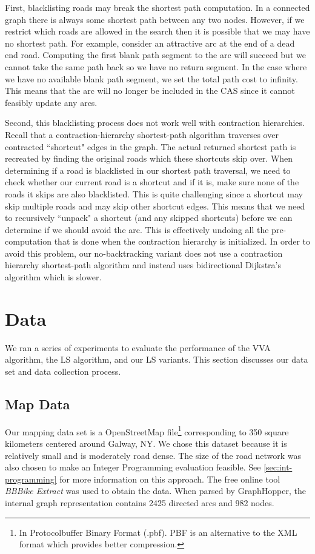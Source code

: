 \documentclass[honors]{union-cs-thesis}
\begin{document}
First, blacklisting roads may break the shortest path computation. In a connected graph there is always some shortest path between any two nodes. However, if we restrict which roads are allowed in the search then it is possible that we may have no shortest path. For example, consider an attractive arc at the end of a dead end road. Computing the first blank path segment to the arc will succeed but we cannot take the same path back so we have no return segment. In the case where we have no available blank path segment, we set the total path cost to infinity. This means that the arc will no longer be included in the CAS since it cannot feasibly update any arcs. 

Second, this blacklisting process does not work well with contraction hierarchies. Recall that a contraction-hierarchy shortest-path algorithm traverses over contracted ``shortcut" edges in the graph. The actual returned shortest path is recreated by finding the original roads which these shortcuts skip over. When determining if a road is blacklisted in our shortest path traversal, we need to check whether our current road is a shortcut and if it is, make sure none of the roads it skips are also blacklisted. This is quite challenging since a shortcut may skip multiple roads and may skip other shortcut edges. This means that we need to recursively ``unpack" a shortcut (and any skipped shortcuts)  before we can determine if we should avoid the arc. This is effectively undoing all the pre-computation that is done when the contraction hierarchy is initialized. In order to avoid this problem, our no-backtracking variant does not use a contraction hierarchy shortest-path algorithm and instead uses bidirectional Dijkstra's algorithm which is slower.


\section{Data}
\label{sec:data}
We ran a series of experiments to evaluate the performance of the VVA algorithm, the LS algorithm, and our LS variants. This section discusses our data set and data collection process.

\subsection{Map Data}
Our mapping data set is a OpenStreetMap file\footnote{In Protocolbuffer Binary Format (.pbf). PBF is an alternative to the XML format which provides better compression.} corresponding to 350 square kilometers centered around Galway, NY. We chose this dataset because it is relatively small and is moderately road dense. The size of the road network was also chosen to make an Integer Programming evaluation feasible. See \cref{sec:int-programming} for more information on this approach. The free online tool \emph{BBBike Extract} \cite{bbbike} was used to obtain the data. When parsed by GraphHopper, the internal graph representation contains 2425 directed arcs and 982 nodes.
\end{document}
